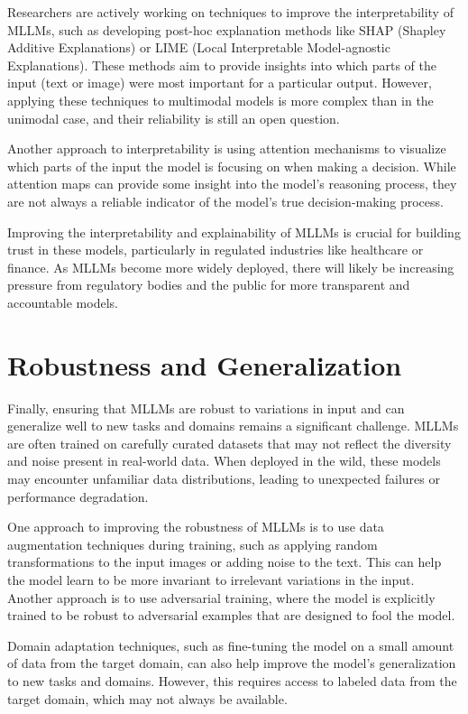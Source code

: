 Researchers are actively working on techniques to improve the interpretability of MLLMs, such as developing post-hoc explanation methods like SHAP (Shapley Additive Explanations) or LIME (Local Interpretable Model-agnostic Explanations). These methods aim to provide insights into which parts of the input (text or image) were most important for a particular output. However, applying these techniques to multimodal models is more complex than in the unimodal case, and their reliability is still an open question.

Another approach to interpretability is using attention mechanisms to visualize which parts of the input the model is focusing on when making a decision. While attention maps can provide some insight into the model's reasoning process, they are not always a reliable indicator of the model's true decision-making process.

Improving the interpretability and explainability of MLLMs is crucial for building trust in these models, particularly in regulated industries like healthcare or finance. As MLLMs become more widely deployed, there will likely be increasing pressure from regulatory bodies and the public for more transparent and accountable models.

\section{Robustness and Generalization}

Finally, ensuring that MLLMs are robust to variations in input and can generalize well to new tasks and domains remains a significant challenge. MLLMs are often trained on carefully curated datasets that may not reflect the diversity and noise present in real-world data. When deployed in the wild, these models may encounter unfamiliar data distributions, leading to unexpected failures or performance degradation.

One approach to improving the robustness of MLLMs is to use data augmentation techniques during training, such as applying random transformations to the input images or adding noise to the text. This can help the model learn to be more invariant to irrelevant variations in the input. Another approach is to use adversarial training, where the model is explicitly trained to be robust to adversarial examples that are designed to fool the model.

Domain adaptation techniques, such as fine-tuning the model on a small amount of data from the target domain, can also help improve the model's generalization to new tasks and domains. However, this requires access to labeled data from the target domain, which may not always be available.

